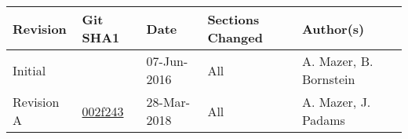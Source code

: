 %
%

\section*{}

\renewcommand{\arraystretch}{1.5}
\begin{table}[htp]
    \begin{center}
        \begin{tabular}{|p{2cm}|p{2cm}|p{2.5cm}|p{4cm}|p{4cm}|}
            \hline
            \textbf{Revision} & \textbf{Git SHA1} & \textbf{Date} & \textbf{Sections Changed} & \textbf{Author(s)} \\
            \hline\hline
            Initial &  & 07-Jun-2016 & All & A. Mazer, B. Bornstein \\
            \hline
            Revision A & \href{https://github.jpl.nasa.gov/oco3/oco3mos/blob/0.25.0/config/cmd.yaml}{002f243} & 28-Mar-2018 & All & A. Mazer, J. Padams \\
            \hline
        \end{tabular}
    \end{center}
\end{table}
